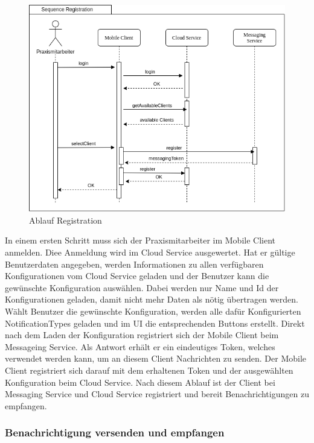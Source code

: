 \begin{figure}[h]
    \centering
    \begin{minipage}[b]{0.7\textwidth}
        \includegraphics[width=\textwidth]{graphics/Sequence_Notification_Register}
        \caption{Ablauf Registration}
    \end{minipage}
\end{figure}

In einem ersten Schritt muss sich der Praxismitarbeiter im Mobile Client anmelden.
Diee Anmeldung wird im Cloud Service ausgewertet.
Hat er gültige Benutzerdaten angegeben, werden Informationen zu allen verfügbaren Konfigurationen vom Cloud Service geladen und der Benutzer kann die gewünschte Konfiguration auswählen.
Dabei werden nur Name und Id der Konfigurationen geladen, damit nicht mehr Daten als nötig übertragen werden.
Wählt Benutzer die gewünschte Konfiguration, werden alle dafür Konfigurierten NotificationTypes geladen und im UI die entsprechenden Buttons erstellt.
Direkt nach dem Laden der Konfiguration registriert sich der Mobile Client beim Messageing Service.
Als Antwort erhält er ein eindeutiges Token, welches verwendet werden kann, um an diesem Client Nachrichten zu senden.
Der Mobile Client registriert sich darauf mit dem erhaltenen Token und der ausgewählten Konfiguration beim Cloud Service.
Nach diesem Ablauf ist der Client bei Messaging Service und Cloud Service registriert und bereit Benachrichtigungen zu empfangen.

\subsubsection*{Benachrichtigung versenden und empfangen}

